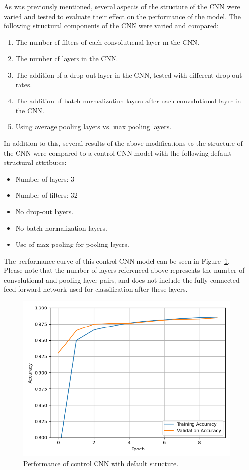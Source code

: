 \documentclass[a4paper]{article}
\begin{document}
As was previously mentioned, several aspects of the structure of the CNN were varied and tested to evaluate their effect on the performance of the model. The following structural components of the CNN were varied and compared:
\begin{enumerate}
    \item The number of filters of each convolutional layer in the CNN.
    \item The number of layers in the CNN.
    \item The addition of a drop-out layer in the CNN, tested with different drop-out rates.
    \item The addition of batch-normalization layers after each convolutional layer in the CNN.
    \item Using average pooling layers vs. max pooling layers. 
\end{enumerate}
In addition to this, several results of the above modifications to the structure of the CNN were compared to a control CNN model with the following default structural attributes:
\begin{itemize}
    \item Number of layers: 3
    \item Number of filters: 32
    \item No drop-out layers.
    \item No batch normalization layers.
    \item Use of max pooling for pooling layers.
\end{itemize}
The performance curve of this control CNN model can be seen in Figure~\ref{fig:control-cnn}. Please note that the number of layers referenced above represents the number of convolutional and pooling layer pairs, and does not include the fully-connected feed-forward network used for classification after these layers.

\begin{figure}[h]
    \centering
    \includegraphics[scale=0.5]{images/control-cnn.png}
    \caption{Performance of control CNN with default structure.}
    \label{fig:control-cnn}
\end{figure}
\end{document}
